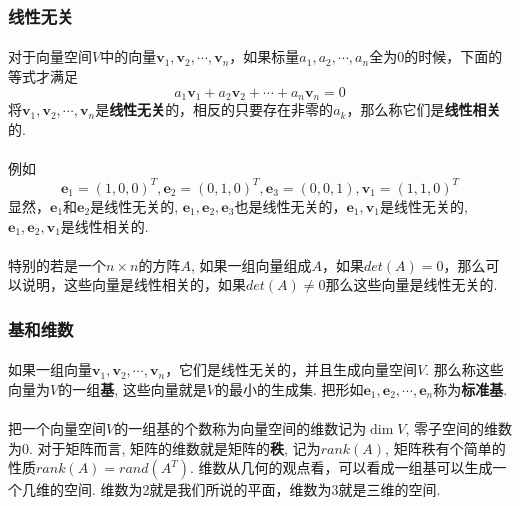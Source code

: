 \subsubsection{线性无关}
\paragraph{}
对于向量空间$V$中的向量$\textbf{v}_1, \textbf{v}_2, \cdots, \textbf{v}_n$，如果标量$a_1, a_2, \cdots, a_n$全为0的时候，下面的等式才满足
$$
a_1\textbf{v}_1 + a_2\textbf{v}_2 + \cdots + a_n\textbf{v}_n = 0
$$
将$\textbf{v}_1, \textbf{v}_2, \cdots, \textbf{v}_n$是\textbf{线性无关}的，相反的只要存在非零的$a_k$，那么称它们是\textbf{线性相关}的.

\paragraph{}
例如
$$
\textbf{e}_1 = (1, 0, 0)^T, \textbf{e}_2 = (0, 1, 0)^T, \textbf{e}_3 = (0, 0, 1), \textbf{v}_1 = (1, 1, 0)^T
$$
显然，$\textbf{e}_1$和$\textbf{e}_2$是线性无关的, $\textbf{e}_1, \textbf{e}_2, \textbf{e}_3$也是线性无关的，$\textbf{e}_1, \textbf{v}_1$是线性无关的, $\textbf{e}_1, \textbf{e}_2, \textbf{v}_1$是线性相关的.

\paragraph{}
特别的若是一个$n\times n$的方阵$A$, 如果一组向量组成$A$，如果$det(A) = 0$，那么可以说明，这些向量是线性相关的，如果$det(A) \neq 0$那么这些向量是线性无关的.


\subsubsection{基和维数}
\paragraph{}
如果一组向量$\textbf{v}_1, \textbf{v}_2, \cdots, \textbf{v}_n$，它们是线性无关的，并且生成向量空间$V$. 那么称这些向量为$V$的一组\textbf{基}, 这些向量就是$V$的最小的生成集. 把形如$\textbf{e}_1, \textbf{e}_2, \cdots, \textbf{e}_n$称为\textbf{标准基}.  

\paragraph{}
把一个向量空间$V$的一组基的个数称为向量空间的$维数$记为$\dim V$, 零子空间的维数为0.  对于矩阵而言, 矩阵的维数就是矩阵的\textbf{秩}, 记为$rank(A)$,  矩阵秩有个简单的性质$rank(A) = rand(A^T)$.  维数从几何的观点看，可以看成一组基可以生成一个几维的空间.  维数为2就是我们所说的平面，维数为3就是三维的空间.  

